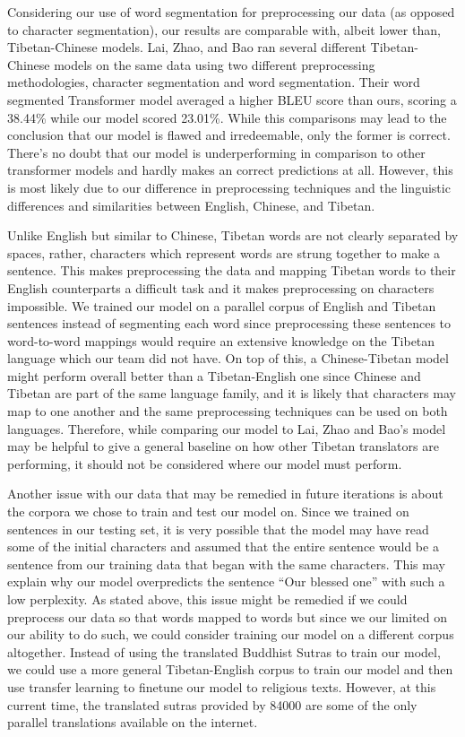 \documentclass[letterpaper, 12 pt, conference]{ieeeconf}  %
\begin{document}
Considering our use of word segmentation for preprocessing our data (as opposed to character segmentation), our results are comparable with, albeit lower than, Tibetan-Chinese models. Lai, Zhao, and Bao ran several different Tibetan-Chinese models on the same data using two different preprocessing methodologies, character segmentation and word segmentation. Their word segmented Transformer model averaged a higher BLEU score than ours, scoring a 38.44\% while our model scored 23.01\%. While this comparisons may lead to the conclusion that our model is flawed and irredeemable, only the former is correct. There’s no doubt that our model is underperforming in comparison to other transformer models and hardly makes an correct predictions at all. However, this is most likely due to our difference in preprocessing techniques and the linguistic differences and similarities between English, Chinese, and Tibetan. 

Unlike English but similar to Chinese, Tibetan words are not clearly separated by spaces, rather, characters which represent words are strung together to make a sentence. This makes preprocessing the data and mapping Tibetan words to their English counterparts a difficult task and it makes preprocessing on characters impossible. We trained our model on a parallel corpus of English and Tibetan sentences instead of segmenting each word since preprocessing these sentences to word-to-word mappings would require an extensive knowledge on the Tibetan language which our team did not have. On top of this, a Chinese-Tibetan model might perform overall better than a Tibetan-English one since Chinese and Tibetan are part of the same language family, and it is likely that characters may map to one another and the same preprocessing techniques can be used on both languages. Therefore, while comparing our model to Lai, Zhao and Bao’s model may be helpful to give a general baseline on how other Tibetan translators are performing, it should not be considered where our model must perform.

Another issue with our data that may be remedied in future iterations is about the corpora we chose to train and test our model on. Since we trained on sentences in our testing set, it is very possible that the model may have read some of the initial characters and assumed that the entire sentence would be a sentence from our training data that began with the same characters. This may explain why our model overpredicts the sentence “Our blessed one” with such a low perplexity. As stated above, this issue might be remedied if we could preprocess our data so that words mapped to words but since we our limited on our ability to do such, we could consider training our model on a different corpus altogether. Instead of using the translated Buddhist Sutras to train our model, we could use a more general Tibetan-English corpus to train our model and then use transfer learning to finetune our model to religious texts. However, at this current time, the translated sutras provided by 84000 are some of the only parallel translations available on the internet.
\end{document}
